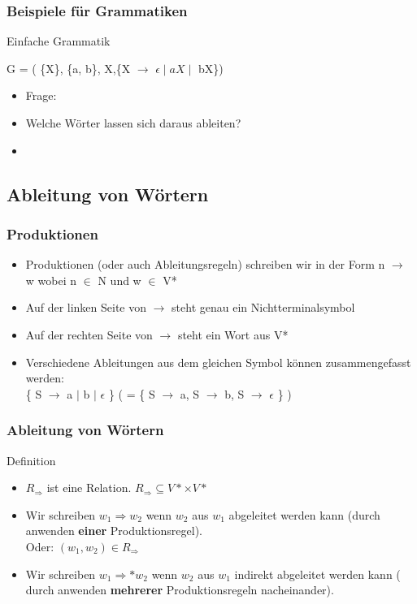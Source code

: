 \documentclass{beamer}
\begin{document}
\begin{frame}
	\frametitle{Beispiele f\"ur Grammatiken}

	\begin{block}{Einfache Grammatik}
		\begin{center}
			G = ( \{X\}, \{a, b\}, X,\{X $\rightarrow$ $\epsilon \mid aX \mid$ bX\})
		\end{center}
		
		\pause
		\begin{itemize}
			\item Frage: \\
			\item Welche W\"orter lassen sich daraus ableiten? \\
			\item {}
		\end{itemize}


	\end{block}
\end{frame}

\subsection{Ableitung von Wörtern}
\begin{frame}
	\frametitle{Produktionen}
	\begin{itemize}
		\item Produktionen (oder auch Ableitungsregeln) schreiben wir in der Form n $\rightarrow$ w wobei n $\in$ N und w 				$\in$ V*
		\item Auf der linken Seite von $\rightarrow$ steht genau ein Nichtterminalsymbol
		\item Auf der rechten Seite von $\rightarrow$ steht ein Wort aus V*
		\item Verschiedene Ableitungen aus dem gleichen Symbol können zusammengefasst werden: \\
		\{ S $\rightarrow$ a $\mid$ b $\mid$ $\epsilon$ \} ( = \{ S $\rightarrow$ a,  S $\rightarrow$ b,  S $\rightarrow$ 					$\epsilon$ \} )
	\end{itemize}
\end{frame}



\begin{frame}
	\frametitle{Ableitung von W\"ortern}

	\begin{block} {Definition }
		\begin{itemize}
			\item $R_\Rightarrow$ ist eine Relation. $R_\Rightarrow \subseteq V* \times V*$
			\item Wir schreiben $w_1 \Rightarrow w_2$ wenn $w_2$ aus $w_1$ abgeleitet werden kann (durch anwenden 					\textbf{einer} Produktionsregel). \\
			Oder: $(w_1, w_2) \in R_\Rightarrow$
			\item Wir schreiben $w_1 \Rightarrow * w_2$ wenn $w_2$ aus $w_1$ indirekt abgeleitet werden kann ( durch 					anwenden \textbf{mehrerer} Produktionsregeln nacheinander).
		\end{itemize}
	\end{block}
\end{frame}
\end{document}
